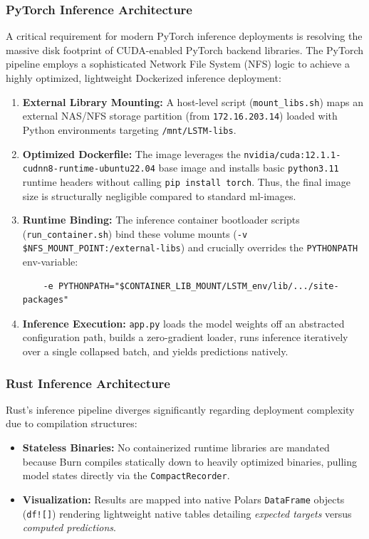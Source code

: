 \documentclass[10pt,a4paper,twocolumn]{article}
\begin{document}
\subsubsection{PyTorch Inference Architecture}
A critical requirement for modern PyTorch inference deployments is resolving the massive disk footprint of CUDA-enabled PyTorch backend libraries. The PyTorch pipeline employs a sophisticated Network File System (NFS) logic to achieve a highly optimized, lightweight Dockerized inference deployment:
\begin{enumerate}
    \item \textbf{External Library Mounting:} A host-level script (\texttt{mount\_libs.sh}) maps an external NAS/NFS storage partition (from \texttt{172.16.203.14}) loaded with Python environments targeting \texttt{/mnt/LSTM-libs}.
    \item \textbf{Optimized Dockerfile:} The image leverages the \texttt{nvidia/cuda:12.1.1-cudnn8-runtime-ubuntu22.04} base image and installs basic \texttt{python3.11} runtime headers without calling \texttt{pip install torch}. Thus, the final image size is structurally negligible compared to standard ml-images.
    \item \textbf{Runtime Binding:} The inference container bootloader scripts (\texttt{run\_container.sh}) bind these volume mounts (\texttt{-v \$NFS\_MOUNT\_POINT:/external-libs}) and crucially overrides the \texttt{PYTHONPATH} env-variable:
    \begin{verbatim}
    -e PYTHONPATH="$CONTAINER_LIB_MOUNT/LSTM_env/lib/.../site-packages"
    \end{verbatim}
    \item \textbf{Inference Execution:} \texttt{app.py} loads the model weights off an abstracted configuration path, builds a zero-gradient loader, runs inference iteratively over a single collapsed batch, and yields predictions natively. 
\end{enumerate}

\subsubsection{Rust Inference Architecture}
Rust's inference pipeline diverges significantly regarding deployment complexity due to compilation structures:
\begin{itemize}
    \item \textbf{Stateless Binaries:} No containerized runtime libraries are mandated because Burn compiles statically down to heavily optimized binaries, pulling model states directly via the \texttt{CompactRecorder}.
    \item \textbf{Visualization:} Results are mapped into native Polars \texttt{DataFrame} objects (\texttt{df![]}) rendering lightweight native tables detailing \textit{expected targets} versus \textit{computed predictions}.
\end{itemize}
\end{document}
